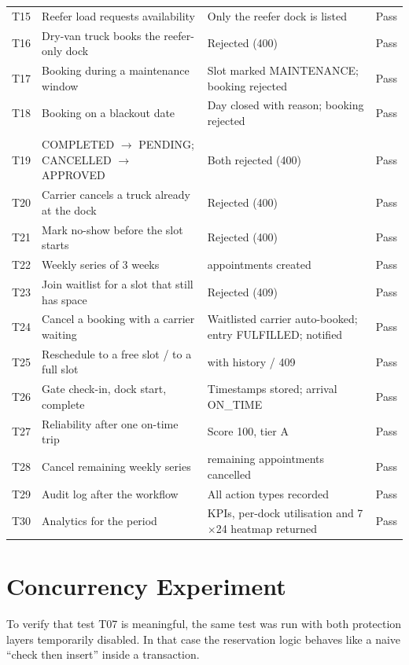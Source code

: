 {\begin{longtable}{>{\raggedright\arraybackslash}p{0.7cm}>{\raggedright\arraybackslash}p{6.2cm}>{\raggedright\arraybackslash}p{5.6cm}c}
T15 & Reefer load requests availability & Only the reefer dock is listed & Pass\\
T16 & Dry-van truck books the reefer-only dock & Rejected (400) & Pass\\
T17 & Booking during a maintenance window & Slot marked MAINTENANCE; booking rejected & Pass\\
T18 & Booking on a blackout date & Day closed with reason; booking rejected & Pass\\
\multicolumn{4}{l}{\textit{Lifecycle and workflows}}\\
T19 & COMPLETED $\rightarrow$ PENDING; CANCELLED $\rightarrow$ APPROVED & Both rejected (400) & Pass\\
T20 & Carrier cancels a truck already at the dock & Rejected (400) & Pass\\
T21 & Mark no-show before the slot starts & Rejected (400) & Pass\\
T22 & Weekly series of 3 weeks & 3 appointments created & Pass\\
T23 & Join waitlist for a slot that still has space & Rejected (409) & Pass\\
T24 & Cancel a booking with a carrier waiting & Waitlisted carrier auto-booked; entry FULFILLED; notified & Pass\\
T25 & Reschedule to a free slot / to a full slot & 200 with history / 409 & Pass\\
T26 & Gate check-in, dock start, complete & Timestamps stored; arrival ON\_TIME & Pass\\
T27 & Reliability after one on-time trip & Score 100, tier A & Pass\\
T28 & Cancel remaining weekly series & 2 remaining appointments cancelled & Pass\\
T29 & Audit log after the workflow & All action types recorded & Pass\\
T30 & Analytics for the period & KPIs, per-dock utilisation and 7$\times$24 heatmap returned & Pass\\
\bottomrule
\end{longtable}
}

\section{Concurrency Experiment}\label{sec:concurrency}
To verify that test T07 is meaningful, the same test was run with both protection layers temporarily disabled. In that case the reservation logic behaves like a naive ``check then insert'' inside a transaction.

